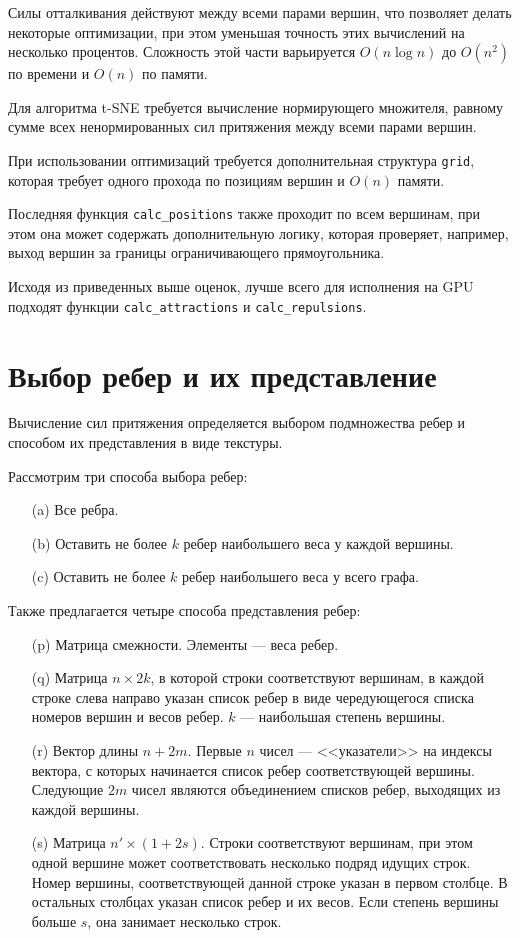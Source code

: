 Силы отталкивания действуют между всеми парами вершин, что позволяет делать некоторые оптимизации, при этом уменьшая точность этих вычислений на несколько процентов. Сложность этой части варьируется $O(n\log n)$ до $O(n^2)$ по времени и $O(n)$ по памяти.

Для алгоритма t-SNE требуется вычисление нормирующего множителя, равному сумме всех ненормированных сил притяжения между всеми парами вершин. 

При использовании оптимизаций требуется дополнительная структура \texttt{grid}, которая требует одного прохода по позициям вершин и $O(n)$ памяти.

Последняя функция \texttt{calc\_positions} также проходит по всем вершинам, при этом она может содержать дополнительную логику, которая проверяет, например, выход вершин за границы ограничивающего прямоугольника.

Исходя из приведенных выше оценок, лучше всего для исполнения на GPU подходят функции \texttt{calc\_attractions} и \texttt{calc\_repulsions}.

\section{Выбор ребер и их представление}

Вычисление сил притяжения определяется выбором подмножества ребер и способом их представления в виде текстуры.

Рассмотрим три способа выбора ребер:
\begin{itemize}
\item[(a)] Все ребра.
\item[(b)] Оставить не более $k$ ребер наибольшего веса у каждой вершины.
\item[(c)] Оставить не более $k$ ребер наибольшего веса у всего графа.
\end{itemize}

Также предлагается четыре способа представления ребер:
\begin{itemize}
\item[(p)] Матрица смежности. Элементы --- веса ребер.
\item[(q)] Матрица $n\times 2k$, в которой строки соответствуют вершинам, в каждой строке слева направо указан список ребер в виде чередующегося списка номеров вершин и весов ребер. $k$ --- наибольшая степень вершины.
\item[(r)] Вектор длины $n + 2m$. Первые $n$ чисел --- <<указатели>> на индексы вектора, с которых начинается список ребер соответствующей вершины. Следующие $2m$ чисел являются объединением списков ребер, выходящих из каждой вершины.
\item[(s)] Матрица $n'\times (1 + 2s)$. Строки соответствуют вершинам, при этом одной вершине может соответствовать несколько подряд идущих строк. Номер вершины, соответствующей данной строке указан в первом столбце. В остальных столбцах указан список ребер и их весов. Если степень вершины больше $s$, она занимает несколько строк.
\end{itemize}

